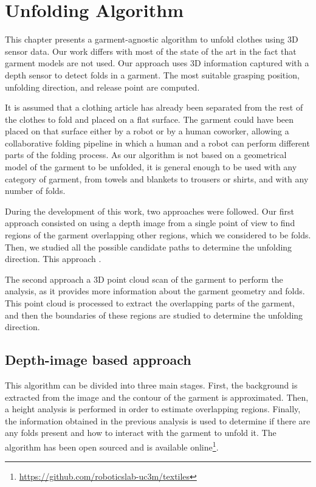 \chapter{Unfolding Algorithm}
\label{architecture}

This chapter presents a garment-agnostic algorithm to unfold clothes using 3D sensor data. Our work differs with most of the state of the art in the fact that garment models are not used. Our approach uses 3D information captured with a depth sensor to detect folds in a garment. The most suitable grasping position, unfolding direction, and release point are computed.

It is assumed that a clothing article has already been separated from the rest of the clothes to fold and placed on a flat surface. The garment could have been placed on that surface either by a robot or by a human coworker, allowing a collaborative folding pipeline in which a human and a robot can perform different parts of the folding process.
As our algorithm is not based on a geometrical model of the garment to be unfolded, it is general enough to be used with any category of garment, from towels and blankets to trousers or shirts, and with any number of folds. 

During the development of this work, two approaches were followed. Our first approach consisted on using a depth image from a single point of view to find regions of the garment overlapping other regions, which we considered to be folds. Then, we studied all the possible candidate paths to determine the unfolding direction. This approach .

The second approach  a 3D point cloud scan of the garment to perform the analysis, as it provides more information about the garment geometry and folds. This point cloud is processed to extract the overlapping parts of the garment, and then the boundaries of these regions are studied to determine the unfolding direction.

\section{Depth-image based approach}
This algorithm can be divided into three main stages. First, the background is extracted from the image and the contour of the garment is approximated. Then, a height analysis is performed in order to estimate overlapping regions. Finally, the information obtained in the previous analysis is used to determine if there are any folds present and how to interact with the garment to unfold it. The algorithm has been open sourced and is available online\footnote{\url{https://github.com/roboticslab-uc3m/textiles}}.


